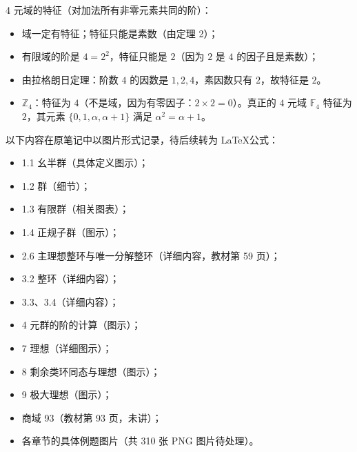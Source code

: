 \begin{example}[4 元群的特征与阶]
4 元域的特征（对加法所有非零元素共同的阶）：
\begin{itemize}
  \item 域一定有特征；特征只能是素数（由定理 2）；
  \item 有限域的阶是 $4 = 2^2$，特征只能是 $2$（因为 $2$ 是 $4$ 的因子且是素数）；
  \item 由拉格朗日定理：阶数 $4$ 的因数是 $1, 2, 4$，素因数只有 $2$，故特征是 $2$。
  \item $\mathbb{Z}_4$：特征为 $4$（不是域，因为有零因子：$2 \times 2 = 0$）。真正的 $4$ 元域 $\mathbb{F}_4$ 特征为 $2$，其元素 $\{0, 1, \alpha, \alpha+1\}$ 满足 $\alpha^2 = \alpha + 1$。
\end{itemize}
\end{example}

\begin{note}
以下内容在原笔记中以图片形式记录，待后续转为 \LaTeX 公式：
\begin{itemize}
  \item 1.1 幺半群（具体定义图示）；
  \item 1.2 群（细节）；
  \item 1.3 有限群（相关图表）；
  \item 1.4 正规子群（图示）；
  \item 2.6 主理想整环与唯一分解整环（详细内容，教材第 59 页）；
  \item 3.2 整环（详细内容）；
  \item 3.3、3.4（详细内容）；
  \item 4 元群的阶的计算（图示）；
  \item 7 理想（详细图示）；
  \item 8 剩余类环同态与理想（图示）；
  \item 9 极大理想（图示）；
  \item 商域 93（教材第 93 页，未讲）；
  \item 各章节的具体例题图片（共 310 张 PNG 图片待处理）。
\end{itemize}
\end{note}
